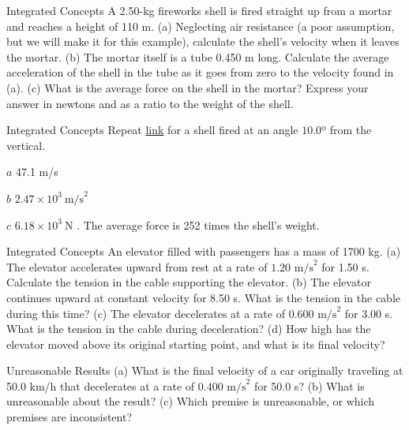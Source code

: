 \documentclass[
]{book}
\newenvironment{problems-exercises}{}{}
\newenvironment{tinysection}{}{}
\begin{document}
\begin{problems-exercises}
\begin{tinysection}
{Integrated Concepts} A 2.50-kg fireworks shell is
fired straight up from a mortar and reaches a height of 110 m. (a)
Neglecting air resistance (a poor assumption, but we will make it for
this example), calculate the shell's velocity when it leaves the mortar.
(b) The mortar itself is a tube 0.450 m long. Calculate the average
acceleration of the shell in the tube as it goes from zero to the
velocity found in (a). (c) What is the average force on the shell in the
mortar? Express your answer in newtons and as a ratio to the weight of
the shell.

\end{tinysection}

\hypertarget{fs-id2963222}{}
\hypertarget{fs-id3253390}{}
\begin{tinysection}

{Integrated Concepts} Repeat
\protect\hyperlink{fs-id3178018}{link} for a shell fired at an
angle \(\text{10.0º}{}\) from the vertical.

\end{tinysection}

\leavevmode\hypertarget{fs-id3062924}{}%
\(a\) 47.1 m/s

\(b\) \({2\text{.}{\text{47} \times \text{10}^{3}}\ \text{m/s}^{2}}{}\)

\(c\) \({6.18 \times \text{10}^{3}}\ \text{N}\) . The average force is 252
times the shell's weight.

\hypertarget{fs-id3028228}{}
\hypertarget{fs-id3012359}{}
\begin{tinysection}

{Integrated Concepts} An elevator filled with
passengers has a mass of 1700 kg. (a) The elevator accelerates upward
from rest at a rate of \({1\text{.}\text{20\ m/s}^{2}}{}\) for 1.50 s.
Calculate the tension in the cable supporting the elevator. (b) The
elevator continues upward at constant velocity for 8.50 s. What is the
tension in the cable during this time? (c) The elevator decelerates at a
rate of \({0\text{.}\text{600\ m/s}^{2}}{}\) for 3.00 s. What is the
tension in the cable during deceleration? (d) How high has the elevator
moved above its original starting point, and what is its final velocity?

\end{tinysection}

\hypertarget{fs-id2670683}{}
\hypertarget{fs-id2670686}{}
\begin{tinysection}

{Unreasonable Results} (a) What is the final velocity
of a car originally traveling at 50.0 km/h that decelerates at a rate of
\({0\text{.}\text{400\ m/s}^{2}}{}\) for 50.0 s? (b) What is unreasonable
about the result? (c) Which premise is unreasonable, or which premises
are inconsistent?


\end{tinysection}
\end{problems-exercises}
\end{document}

